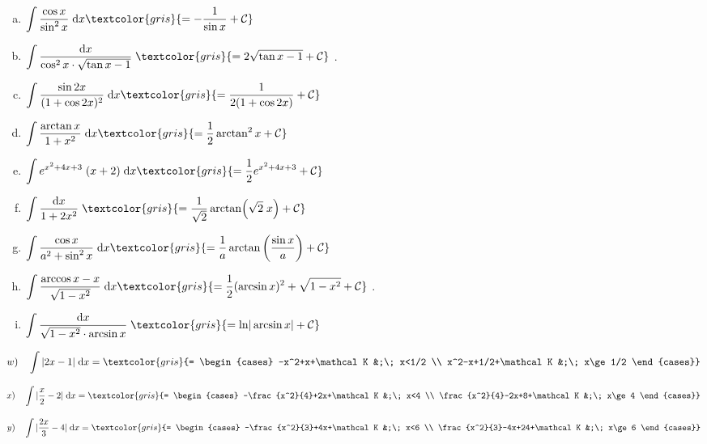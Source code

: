 \begin{multicols}{2}
\begin{enumerate}[a) ]
\item  $\displaystyle \int \dfrac {\cos x}{\sin^2 x} \; \dd x \textcolor{gris}{= - \dfrac {1}{\sin x} +\mathcal C}$
\item  \small{$\displaystyle \int \dfrac {\dd x}{\cos^2 x \cdot \sqrt{\tan x - 1}} \;  \textcolor{gris}{= 2 \sqrt{\tan x - 1} +\mathcal C}$} \normalsize{.}
\item  $\displaystyle \int \dfrac {\sin 2x}{(1+\cos 2x)^2} \; \dd x \textcolor{gris}{= \dfrac {1}{2(1+\cos 2x)} +\mathcal C}$
\item  $\displaystyle \int \dfrac {\arctan x}{1+x^2} \; \dd x \textcolor{gris}{= \frac 1 2 \arctan^2 x +\mathcal C}$
\item  $\displaystyle \int e^{x^2+4x+3}\; (x+2) \; \dd x \textcolor{gris}{= \frac 1 2 e^{x^2+4x+3} +\mathcal C}$
\item  $\displaystyle \int \dfrac {\dd x}{1+2x^2} \;  \textcolor{gris}{= \frac {1}{\sqrt{2}} 	\arctan (\sqrt{2} \; x) +\mathcal C}$
\item  $\displaystyle \int \dfrac {\cos x}{a^2+\sin^2 x} \; \dd x \textcolor{gris}{= \frac 1 a \arctan \left(\dfrac {\sin x}{a} \right) +\mathcal C}$
\item  \footnotesize{$\displaystyle \int 	\dfrac{\arccos x - x}{\sqrt{1-x^2}} \; \dd x \textcolor{gris}{= \frac 1 2 (\arcsin x)^2+\sqrt{1-x^2} +\mathcal C}$} \normalsize{.}
\item  $\displaystyle \int \dfrac {\dd x }{\sqrt{1-x^2}\cdot \arcsin x} \; \textcolor{gris}{= \mathrm{ln} |\arcsin x| +\mathcal C}$
\end{enumerate}
\end{multicols}

$w)\quad \displaystyle \int |2x-1| \;  \dd x =  \textcolor{gris}{= \begin{cases}
	-x^2+x+\mathcal K &;\; x<1/2  \\
	x^2-x+1/2+\mathcal K &;\;  x\ge 1/2
	\end{cases}}$ 
	
$x)\quad \displaystyle \int |\frac x 2 - 2| \;  \dd x =  \textcolor{gris}{= \begin{cases}
	-\frac {x^2}{4}+2x+\mathcal K &;\;  x<4 \\
	\frac {x^2}{4}-2x+8+\mathcal K &;\;  x\ge 4
	\end{cases}}$ 
	
$y)\quad \displaystyle \int |\frac {2x}{3}-4| \;  \dd x =  \textcolor{gris}{= \begin{cases}
	-\frac {x^2}{3}+4x+\mathcal K &;\;  x<6 \\
	 \frac {x^2}{3}-4x+24+\mathcal K &;\;  x\ge 6
	\end{cases}}$ 
	
